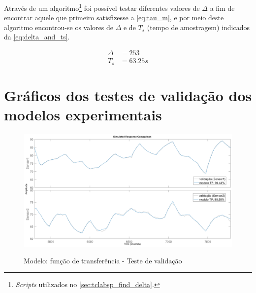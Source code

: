 \begin{apendicesenv}
Através de um algoritmo\footnote{
	\textit{Scripts} utilizados no \cref{sec:tclabsp_find_delta}.
} foi possível testar diferentes valores de $\Delta$ a fim de encontrar
aquele que primeiro satisfizesse a \cref{eq:tau_m}, e por meio deste algoritmo encontrou-se
os valores de $\Delta$ e de $T_s$ (tempo de amostragem) indicados da \cref{eq:delta_and_ts}.

\begin{subequations}
    \label{eq:delta_and_ts}
    \begin{align}
		\Delta &= 253	\\
		T_s &= 63.25s
    \end{align}
\end{subequations}

\chapter{Gráficos dos testes de validação dos modelos experimentais}
\label{ch:graficos_testes_de_validacao}

\begin{figure}
	\caption{Modelo: função de transferência - Teste de validação}
	\begin{center}
		\includegraphics[width=1.00\textwidth]{./5_images/tclabsp-models-TF-compare.png} 
		\label{fig:tclabsp-models-tf-compare}
	\end{center}
	\centering
\end{figure}


\end{apendicesenv}
